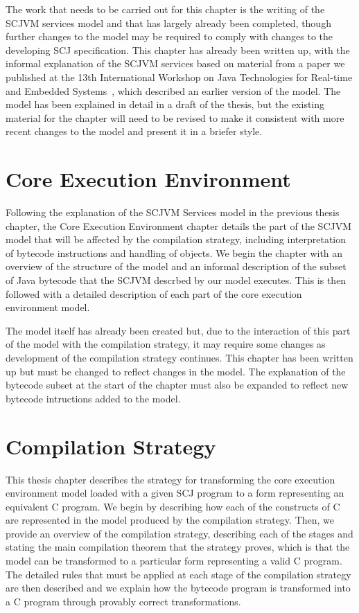 \documentclass[a4paper,10pt]{report}
\begin{document}
The work that needs to be carried out for this chapter is the writing
of the SCJVM services model and that has largely already been
completed, though further changes to the model may be required to
comply with changes to the developing SCJ specification.
This chapter has already been written up, with the informal
explanation of the SCJVM services based on material from a paper we
published at the 13th International Workshop on Java Technologies for
Real-time and Embedded Systems~\cite{baxter2015a}, which described an
earlier version of the model.
The model has been explained in detail in a draft of the thesis, but
the existing material for the chapter will need to be revised to make
it consistent with more recent changes to the model and present it in
a briefer style.

\section{Core Execution Environment}

Following the explanation of the SCJVM Services model in the previous
thesis chapter, the Core Execution Environment chapter details the
part of the SCJVM model that will be affected by the compilation
strategy, including interpretation of bytecode instructions and
handling of objects.
We begin the chapter with an overview of the structure of the model
and an informal description of the subset of Java bytecode that the
SCJVM descrbed by our model executes.
This is then followed with a detailed description of each part of the
\Circus{} core execution environment model.

The model itself has already been created but, due to the interaction
of this part of the model with the compilation strategy, it may
require some changes as development of the compilation strategy
continues.
This chapter has been written up but must be changed to reflect
changes in the model.
The explanation of the bytecode subset at the start of the chapter
must also be expanded to reflect new bytecode intructions added to the
model.

\section{Compilation Strategy}

This thesis chapter describes the strategy for transforming the core
execution environment model loaded with a given SCJ program to a form
representing an equivalent C program.
We begin by describing how each of the constructs of C are represented
in the \Circus{} model produced by the compilation strategy.
Then, we provide an overview of the compilation strategy, describing
each of the stages and stating the main compilation theorem that the
strategy proves, which is that the model can be transformed to a
particular form representing a valid C program.
The detailed rules that must be applied at each stage of the
compilation strategy are then described and we explain how the
bytecode program is transformed into a C program through provably
correct transformations. 
\end{document}
